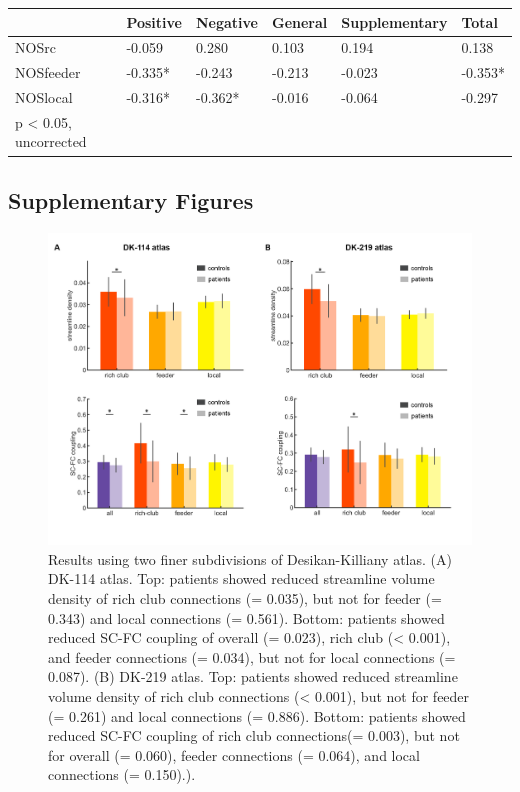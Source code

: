 \begin{refsection}
\bigskip

\scriptsize
\centering
{}
\label{tableS2:Corr} 
\begin{tabular}{llllll}\toprule
 &Positive&Negative&General&Supplementary&Total\\
 \midrule
NOSrc&-0.059&0.280&0.103&0.194&0.138\\
NOSfeeder&-0.335*&-0.243&-0.213&-0.023&-0.353*\\
NOSlocal&-0.316*&-0.362*&-0.016&-0.064&-0.297\\
\bottomrule
\scriptsize *  p < 0.05, uncorrected
\end{tabular}

\bigskip

\newpage
\begin{flushleft}
\section*{Supplementary Figures}
\end{flushleft}

\begin{figure}[H]
\centering
  \includegraphics[width=\linewidth]{images/rcsczFigS1.png}
  \caption{\small Results using two finer subdivisions of Desikan-Killiany atlas. (A) DK-114 atlas. Top: patients showed reduced streamline volume density of rich club connections (\pval = 0.035), but not for feeder (\pval = 0.343) and local connections (\pval = 0.561). Bottom: patients showed reduced SC-FC coupling of overall (\pval = 0.023), rich club (\pval < 0.001), and feeder connections (\pval = 0.034), but not for local connections (\pval = 0.087). (B) DK-219 atlas. Top: patients showed reduced streamline volume density of rich club connections (\pval < 0.001), but not for feeder (\pval = 0.261) and local connections (\pval = 0.886). Bottom: patients showed reduced SC-FC coupling of rich club connections(\pval = 0.003), but not for overall (\pval = 0.060), feeder connections (\pval = 0.064), and local connections (\pval = 0.150).).
}
  \label{figureS1:dk114and250}
\end{figure}


\end{refsection}
